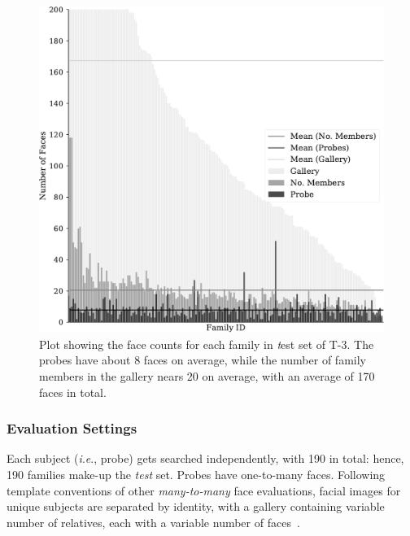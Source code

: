 \documentclass[letterpaper, 10 pt, conference]{ieeeconf}
\newcommand{\ie}{\textit{i}.\textit{e}., }
\begin{document}
\begin{figure}[t!]
    \centering
    \includegraphics[width = .8\linewidth]{figures/barplot-crop.pdf}
    \caption{Plot showing the face counts for each family in {\emph test} set of T-3. The probes have about 8 faces on average, while the number of family members in the gallery nears 20 on average, with an average of 170 faces in total.}
    \label{fig:track3:counts}
\end{figure}
%
\subsubsection{Evaluation Settings} 
Each subject (\ie probe) gets searched independently, with 190 in total: hence, 190 families make-up the \textit{test} set. Probes have one-to-many faces. Following template conventions of other \textit{many-to-many} face evaluations, facial images for unique subjects are separated by identity, with a gallery containing variable number of relatives, each with a variable number of faces~\cite{whitelam2017iarpa}.
\end{document}
